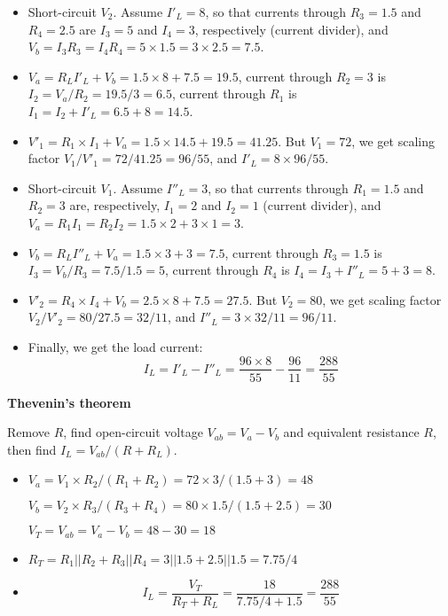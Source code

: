 \documentclass{article}
\begin{document}
\begin{itemize}

\item Short-circuit $V_2$. Assume $I'_L=8$, so that currents through
	$R_3=1.5$ and $R_4=2.5$ are $I_3=5$ and $I_4=3$, respectively
	(current divider), and $V_b=I_3R_3=I_4R_4=5\times 1.5=3\times 2.5=7.5$.
\item $V_a=R_L I'_L+V_b=1.5\times 8+7.5=19.5$, current through $R_2=3$
	is $I_2=V_a/R_2=19.5/3=6.5$, current through $R_1$ is 
	$I_1=I_2+I'_L=6.5+8=14.5$.
\item $V'_1=R_1\times I_1+V_a=1.5\times 14.5+19.5=41.25$. But $V_1=72$,
	we get scaling factor $V_1/V'_1=72/41.25=96/55$, and 
	$I'_L=8 \times 96/55$.

\item Short-circuit $V_1$. Assume $I''_L=3$, so that currents through
	$R_1=1.5$ and $R_2=3$ are, respectively, $I_1=2$ and $I_2=1$
	(current divider), and $V_a=R_1I_1=R_2I_2=1.5\times 2+3\times 1=3$.
\item $V_b=R_L I''_L+V_a=1.5\times 3+3=7.5$, current through $R_3=1.5$
	is $I_3=V_b/R_3=7.5/1.5=5$, current through $R_4$ is 
	$I_4=I_3+I''_L=5+3=8$.
\item $V'_2=R_4\times I_4+V_b=2.5\times 8+7.5=27.5$. But $V_2=80$,
	we get scaling factor $V_2/V'_2=80/27.5=32/11$, and 
	$I''_L=3\times 32/11=96/11$.

\item Finally, we get the load current:
\begin{equation}	
  I_L=I'_L-I''_L=\frac{96\times 8}{55}-\frac{96}{11}=\frac{288}{55} 
\end{equation}

\end{itemize}

{\bf Thevenin's theorem}

Remove $R$, find open-circuit voltage $V_{ab}=V_a-V_b$ and equivalent
resistance $R$, then find $I_L=V_{ab}/(R+R_L)$.

\begin{itemize}
\item 
  $V_a=V_1\times R_2/(R_1+R_2)=72\times 3/(1.5+3)=48$

  $V_b=V_2\times R_3/(R_3+R_4)=80\times 1.5/(1.5+2.5)=30$

  $V_T=V_{ab}=V_a-V_b=48-30=18$
\item 
  $R_T=R_1 || R_2 + R_3 || R_4=3||1.5+2.5||1.5=7.75/4$
\item 
  \begin{equation} 
    I_L=\frac{V_T}{R_T+R_L}=\frac{18}{7.75/4+1.5}=\frac{288}{55} 
  \end{equation}
\end{itemize}
\end{document}
